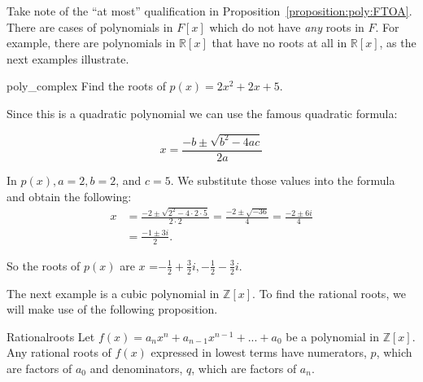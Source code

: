 
Take note of the ``at most'' qualification in Proposition~\ref{proposition:poly:FTOA}. There are cases of polynomials in $F[x]$ which do not have  \emph{any} roots in $F$. For example, there are polynomials in $\mathbb{R}[x]$ that have no roots at all in $\mathbb{R}[x]$, as the next examples illustrate.

\begin{example}{poly_complex} 
Find the roots of $p(x)=2x^2+2x+5$.

Since this is a quadratic polynomial we can use the famous quadratic formula:

$$x=\frac {-b \pm \sqrt{b^2-4ac}}{2a}$$

In $p(x), a=2, b=2$, and $c=5.$ We substitute those values into the formula and obtain the following:
\begin{align*}
x&=\frac {-2 \pm \sqrt{2^2-4\cdot 2\cdot 5}}{2\cdot 2}=\frac {-2 \pm \sqrt{-36}}{4}=\frac {-2 \pm 6i}{4}\\
&=\frac {-1 \pm 3i}{2}.
\end{align*}

So the roots of $p(x)$ are $x$ ={$-\frac{1}{2}+\frac{3}{2}i, -\frac{1}{2}-\frac{3}{2}i$}.
\end{example}

The next example is a cubic polynomial in $\mathbb{Z}[x]$. To find the rational roots, we will make use of the following proposition.

\begin{prop}{Rationalroots}
Let $f(x) = a_{n}x^n+a_{n-1}x^{n-1}+...+a_{0}$ be a polynomial in $\mathbb{Z}[x]$. Any rational roots of $f(x)$ expressed in lowest terms have numerators, $p$, which are factors of $a_{0}$ and denominators, $q$, which are factors of $a_{n}$.
\end {prop}

